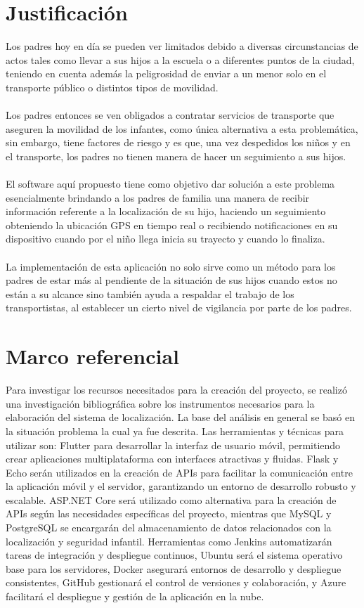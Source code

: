 \documentclass[12pt,onehalfspacing]{report}
\begin{document}
\section{Justificación}
Los padres hoy en día se pueden ver limitados debido a diversas circunstancias de actos tales como llevar a sus hijos a la escuela o a diferentes puntos de la ciudad, teniendo en cuenta además la peligrosidad de enviar a un menor solo en el transporte público o distintos tipos de movilidad.\\\\
Los padres entonces se ven obligados a contratar servicios de transporte que aseguren la movilidad de los infantes, como única alternativa a esta problemática, sin embargo, tiene factores de riesgo y es que, una vez despedidos los niños y en el transporte, los padres no tienen manera de hacer un seguimiento a sus hijos.\\\\ 
El software aquí propuesto tiene como objetivo dar solución a este problema esencialmente brindando a los padres de familia una manera de recibir información referente a la localización de su hijo, haciendo un seguimiento obteniendo la ubicación GPS en tiempo real o recibiendo notificaciones en su dispositivo cuando por el niño llega inicia su trayecto y cuando lo finaliza.\\\\
La implementación de esta aplicación no solo sirve como un método para los padres de estar más al pendiente de la situación de sus hijos cuando estos no están a su alcance sino también ayuda a respaldar el trabajo de los transportistas, al establecer un cierto nivel de vigilancia por parte de los padres.

\section{Marco referencial}
Para investigar los recursos necesitados para la creación del proyecto, se realizó una investigación bibliográfica sobre los instrumentos necesarios para la elaboración del sistema de localización. La base del análisis en general se basó en la situación problema la cual ya fue descrita. Las herramientas y técnicas para utilizar son: Flutter para desarrollar la interfaz de usuario móvil, permitiendo crear aplicaciones multiplataforma con interfaces atractivas y fluidas. Flask y Echo serán utilizados en la creación de APIs para facilitar la comunicación entre la aplicación móvil y el servidor, garantizando un entorno de desarrollo robusto y escalable. ASP.NET Core será utilizado como alternativa para la creación de APIs según las necesidades específicas del proyecto, mientras que MySQL y PostgreSQL se encargarán del almacenamiento de datos relacionados con la localización y seguridad infantil. Herramientas como Jenkins automatizarán tareas de integración y despliegue continuos, Ubuntu será el sistema operativo base para los servidores, Docker asegurará entornos de desarrollo y despliegue consistentes, GitHub gestionará el control de versiones y colaboración, y Azure facilitará el despliegue y gestión de la aplicación en la nube.
\end{document}
